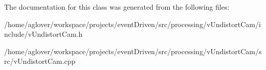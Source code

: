 The documentation for this class was generated from the following files\-:\begin{DoxyCompactItemize}
\item 
/home/aglover/workspace/projects/event\-Driven/src/processing/v\-Undistort\-Cam/include/v\-Undistort\-Cam.\-h\item 
/home/aglover/workspace/projects/event\-Driven/src/processing/v\-Undistort\-Cam/src/v\-Undistort\-Cam.\-cpp\end{DoxyCompactItemize}
